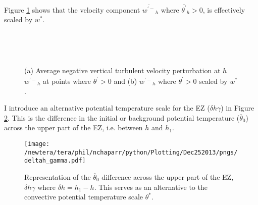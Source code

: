 \clearpage

Figure \ref{fig:downwarm_wvel} shows that the velocity component $\overline{w^{'-}}_{h}$  where $ \overline{\theta^{'}}_{h}>0$, is effectively scaled by $w^{*}$.\\   

\begin{figure}[htbp]
\begin{minipage}[b]{0.5\linewidth}
        \\
        \end{minipage}             
\quad
\begin{minipage}[b]{0.5\linewidth}
        \\       
       \end{minipage}
        \caption[Downward turbulent velocity perturbation at $h$]{(a) Average negative vertical turbulent velocity perturbation at $h$ $\overline{w^{\prime-}}_{h}$ at points where $\theta^{\prime}>0$ and (b) $\overline{w^{\prime-}}_{h}$ where $\theta^{\prime}>0$ scaled by $w^{*}$.}
        \label{fig:downwarm_wvel}
\end{figure}

I introduce an alternative potential temperature scale for the \acs{EZ} ($\delta h \gamma$) in Figure \ref{fig:deltahgamma}. This is the difference in the initial or background potential temperature ($\overline{\theta}_{0}$) across the upper part of the \acs{EZ}, i.e. between $h$ and $h_{1}$.      

\begin{figure}[htbp]
    \centering
    \texttt{[image: /newtera/tera/phil/nchaparr/python/Plotting/Dec252013/pngs/deltah\_gamma.pdf]}
    \caption[Alternative Potential Temperature Scale for the \acs{EZ}]{Representation of the $\overline{\theta}_{0}$ difference across the upper part of the \acs{EZ}, $\delta h \gamma$ where $\delta h = h_{1} - h$. This serves as an alternative to the convective potential temperature scale $\theta^{*}$.}
    \label{fig:deltahgamma}   %
\end{figure}
 
